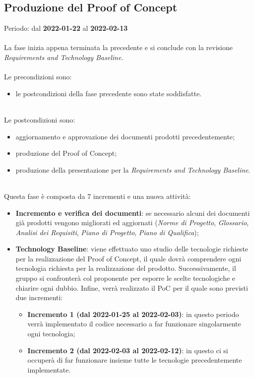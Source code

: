 \subsection{Produzione del Proof of Concept}
Periodo: dal \textbf{2022-01-22} al \textbf{2022-02-13}  \mbox{} \\ \mbox{} \\
La fase inizia appena terminata la precedente e si conclude con la revisione \textit{Requirements and Technology Baseline.} \mbox{} \\ \mbox{} \\
Le precondizioni sono:
\begin{itemize}
    \item le postcondizioni della fase precedente sono state soddisfatte.
\end{itemize}  \mbox{} \\
Le postcondizioni sono:
\begin{itemize}
    \item aggiornamento e approvazione dei documenti prodotti precedentemente;
    \item produzione del Proof of Concept;
    \item produzione della presentazione per la \textit{Requirements and Technology Baseline}.
\end{itemize} \mbox{} \\
Questa fase è composta da 7 incrementi e una nuova attività:
\begin{itemize}
    \item \textbf{Incremento e verifica dei documenti}: se necessario alcuni dei documenti già prodotti vengono migliorati ed aggiornati (\textit{Norme di Progetto}, \textit{Glossario},
    \textit{Analisi dei Requisiti}, \textit{Piano di Progetto}, \textit{Piano di Qualifica});
    \item \textbf{Technology Baseline}: viene effettuato uno studio delle tecnologie richieste per la realizzazione del Proof of Concept, il quale dovrà comprendere ogni tecnologia richiesta per la realizzazione del prodotto. Successivamente, il gruppo si confronterà col proponente per esporre le scelte tecnologiche e chiarire ogni dubbio. Infine, verrà realizzato il PoC per il quale sono previsti due incrementi:
    \begin{itemize}
        \item \textbf{Incremento 1 (dal 2022-01-25 al 2022-02-03)}: in questo periodo verrà implementato il codice necessario a far funzionare singolarmente ogni tecnologia;
        \item \textbf{Incremento 2 (dal 2022-02-03 al 2022-02-12)}: in questo ci si occuperà di far funzionare insieme tutte le tecnologie precedentemente implementate.
    \end{itemize}
\end{itemize}

